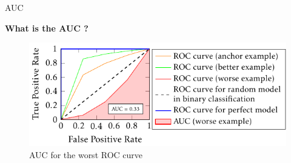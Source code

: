 \begin{frame}{AUC}
    
    {\large\textbf{What is the AUC ?}}

    \begin{figure}
        \centering
        \includegraphics[page=1]{images/output-figure1.pdf}
        \caption{AUC for the worst ROC curve}
    \end{figure}


\end{frame}
